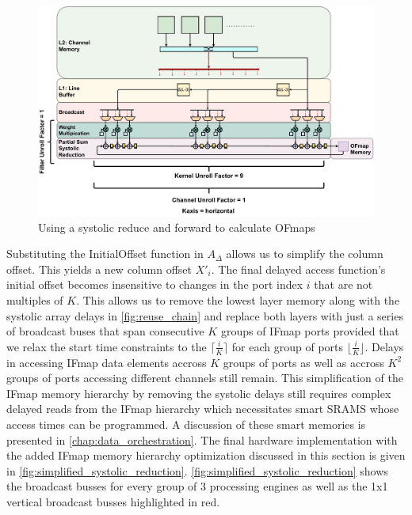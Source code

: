 \begin{figure}[]
    \centering
    \includegraphics[scale=0.36]{fig/hybrid3x3Gemm.pdf}
    \caption{Using a systolic reduce and forward to calculate OFmaps}
    \label{fig:simplified_systolic_reduction}
\end{figure}

Substituting the InitialOffset function in $A_\Delta$  allows us to simplify the
column offset. This yields a new column offset $X'_i$. The final delayed access
function's initial offset becomes insensitive to changes in the port index $i$
that are not multiples of $K$. This allows us to remove the lowest layer memory
along with the systolic array delays in \autoref{fig:reuse_chain} and replace
both layers with just a series of broadcast buses that span consecutive $K$
groups of IFmap ports provided that we relax the start time constraints to the
$\lceil \frac{i}{K} \rceil$ for each group of ports $\lfloor \frac{i}{K}
\rfloor$. Delays in accessing IFmap data elements accross $K$ groups of ports
as well as accross $K^2$ groups of ports accessing different channels still
remain. This simplification of the IFmap memory hierarchy by removing the systolic delays still
requires complex delayed reads from the IFmap hierarchy which necessitates smart
SRAMS whose access times can be programmed. A discussion of these smart memories
is presented in \autoref{chap:data_orchestration}. The final
hardware implementation with the added IFmap memory hierarchy optimization
discussed in this section is given in
\autoref{fig:simplified_systolic_reduction}.
\autoref{fig:simplified_systolic_reduction} shows the broadcast busses for every
group of 3 processing engines as well as the 1x1 vertical broadcast busses
highlighted in red. 

